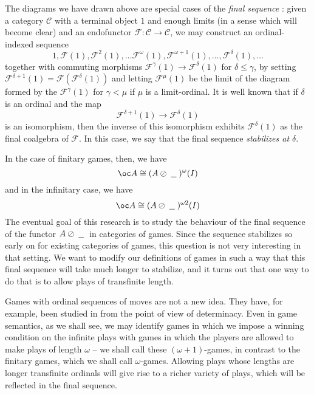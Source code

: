 \documentclass[11pt]{article} %
\theoremstyle{plain} %
\theoremstyle{definition} %
\theoremstyle{note}
\theoremstyle{exercisestyle}
\newcommand*\from{\colon}
\newcommand{\cmap}[3]{#1\from{}#2\to{}#3}
\newcommand{\sequoid}{\oslash}
\newcommand{\F}{\mathcal F}
\newcommand{\blank}{\;\underline{\hspace{1.5ex}}\;}
\newcommand{\C}{{\mathcal{C}}}
\begin{document}
The diagrams we have drawn above are special cases of the \emph{final sequence} \cite{finalseq}: given a category $\C$ with a terminal object $1$ and enough limits (in a sense which will become clear) and an endofunctor $\cmap{\F}{\C}{\C}$, we may construct an ordinal-indexed sequence
\[
  1, \F(1), \F^2(1),\dots \F^\omega(1), \F^{\omega+1}(1),\dots,\F^\delta(1),\dots
  \]
together with commuting morphisms $\F^\gamma(1)\to\F^\delta(1)$ for $\delta\le\gamma$, by setting $\F^{\delta+1}(1) = \F(\F^\delta(1))$ and letting $\F^\mu(1)$ be the limit of the diagram formed by the $\F^\gamma(1)$ for $\gamma<\mu$ if $\mu$ is a limit-ordinal.  It is well known that if $\delta$ is an ordinal and the map
\[
  \F^{\delta+1}(1)\to\F^{\delta}(1)
  \]
is an isomorphism, then the inverse of this isomorphism exhibits $\F^{\delta}(1)$ as the final coalgebra of $\F$.  In this case, we say that the final sequence \emph{stabilizes at $\delta$}.  

In the case of finitary games, then, we have
\[
  \oc A\cong(A\sequoid\blank)^\omega(I)
  \]
and in the infinitary case, we have
\[
  \oc A\cong(A\sequoid\blank)^{\omega2}(I)
  \]
The eventual goal of this research is to study the behaviour of the final sequence of the functor $A\sequoid\blank$ in categories of games.  Since the sequence stabilizes so early on for existing categories of games, this question is not very interesting in that setting.  We want to modify our definitions of games in such a way that this final sequence will take much longer to stabilize, and it turns out that one way to do that is to allow plays of transfinite length.  

Games with ordinal sequences of moves are not a new idea.  They have, for example, been studied in \cite{longgamesbook} from the point of view of determinacy.  Even in game semantics, as we shall see, we may identify games in which we impose a winning condition on the infinite plays with games in which the players are allowed to make plays of length $\omega$ -- we shall call these $(\omega+1)$-games, in contrast to the finitary games, which we shall call $\omega$-games.  Allowing plays whose lengths are longer transfinite ordinals will give rise to a richer variety of plays, which will be reflected in the final sequence.  
\end{document}
